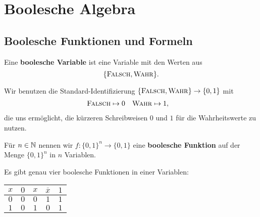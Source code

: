 \chapter{Boolesche Algebra}

\section{Boolesche Funktionen und Formeln} 

\begin{defn}
	Eine \textbf{boolesche Variable} ist eine Variable mit den Werten aus 
	\[
		\{\mathop{\text{\textsc{Falsch}}},\mathop{\text{\textsc{Wahr}}}\}.
	\] 
\end{defn} 

\begin{bem}
Wir benutzen die Standard-Identifizierung $\{\mathop{\text{\textsc{Falsch}}},\mathop{\text{\textsc{Wahr}}}\} \to \{0,1\}$ mit 
\begin{align*}
	\mathop{\text{\textsc{Falsch}}} & \mapsto 0 & \mathop{\text{\textsc{Wahr}}} & \mapsto 1,
\end{align*}
die uns ermöglicht, die kürzeren Schreibweisen $0$ und $1$ für die Wahrheitswerte zu nutzen. 
\end{bem}

\begin{defn}
	Für $n \in \mathbb{N}$ nennen wir $f: \{0,1\}^n \to \{0,1\}$ eine \textbf{boolesche Funktion} auf der Menge $\{0,1\}^n$ in $n$ Variablen. 
\end{defn} 

\begin{bem} Es gibt genau vier boolesche Funktionen in einer Variablen: 
	\begin{center}
			\begin{tabular}{c|cccc}
				$x$ & $0$ & $x$  & $\overline{x}$ & $1$ 
				\\ \hline 
				$0$ & $0$ & $0$ &  $1$ & $1$
				\\ $1$ & $0$ & $1$ & $0$ & $1$ 
			\end{tabular} 
	\end{center} 
\end{bem} 

